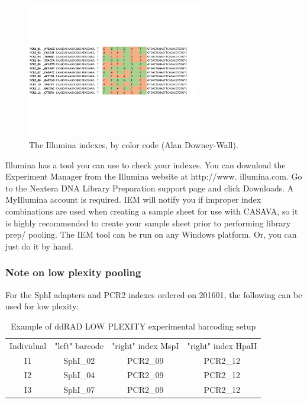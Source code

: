 \documentclass[11pt, oneside]{article}
\begin{document}
    \begin{figure}[h]
			\includegraphics[width=3in]{./images/index_colorcode2.pdf}
			\caption{The Illumina indexes, by color code (Alan Downey-Wall).}
		\end{figure}
Illumina has a tool you can use to check your indexes. You can download the Experiment Manager from the Illumina website at http://www. illumina.com. Go to the Nextera DNA Library Preparation support page and click Downloads. A MyIllumina account is required. IEM will notify you if improper index combinations are used when creating a sample sheet for use with CASAVA, so it is highly recommended to create your sample sheet prior to performing library prep/ pooling. The IEM tool can be run on any Windows platform. Or, you can just do it by hand.
\clearpage

\subsubsection {Note on low plexity pooling}
For the SphI adapters and PCR2 indexes ordered on 201601, the following can be used for low plexity:
\begin{table}[]
\caption{Example of ddRAD LOW PLEXITY experimental barcoding setup}
\begin{center}
\begin{tabular}{c|c|c|c}
Individual & "left" barcode & "right" index MspI & "right" index HpaII  \\
I1 & SphI\_02 & PCR2\_09 & PCR2\_12 \\
I2 & SphI\_04 & PCR2\_09 & PCR2\_12 \\
I3 & SphI\_07 & PCR2\_09 & PCR2\_12 \\
\end{tabular}
\end{center}
\label{default}
\end{table}%
	
\end{document}
